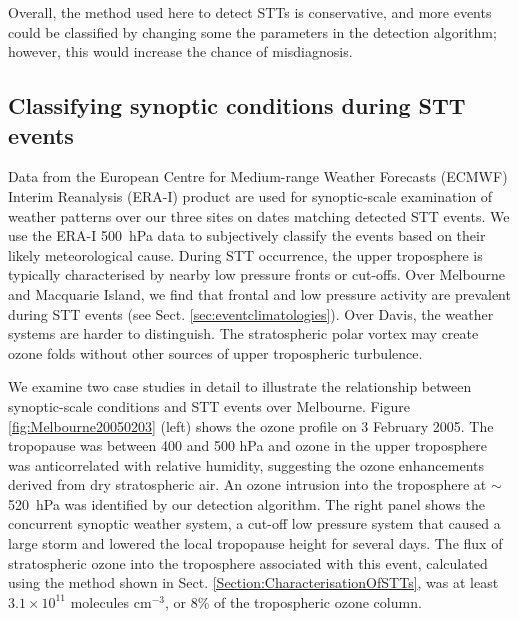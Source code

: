     Overall, the method used here to detect STTs is conservative, and more events could be classified by changing some the parameters in the detection algorithm; however, this would increase the chance of misdiagnosis. 

  \subsection{Classifying synoptic conditions during STT events}
  \label{Section:WeatherClassifications}
    Data from the European Centre for Medium-range Weather Forecasts (ECMWF) Interim Reanalysis (ERA-I) \citep{Dee2011} product are used for synoptic-scale examination of weather patterns over our three sites on dates matching detected STT events.
    We use the ERA-I 500~hPa data to subjectively classify the events based on their likely meteorological cause.
    During STT occurrence, the upper troposphere is typically characterised by nearby low pressure fronts or cut-offs.
    Over Melbourne and Macquarie Island, we find that frontal and low pressure activity are prevalent during STT events (see Sect. \ref{sec:eventclimatologies}).
    Over Davis, the weather systems are harder to distinguish. The stratospheric polar vortex may create ozone folds without other sources of upper tropospheric turbulence.

    We examine two case studies in detail to illustrate the relationship between synoptic-scale conditions and STT events  over Melbourne.
    Figure \ref{fig:Melbourne20050203} (left) shows the ozone profile on 3 February 2005.
    The tropopause was between 400 and 500 hPa and ozone in the upper troposphere was anticorrelated with relative humidity, suggesting the ozone enhancements derived from dry stratospheric air. 
    An ozone intrusion into the troposphere at $\sim$520~hPa was identified by our detection algorithm.
    The right panel shows the concurrent synoptic weather system, a cut-off low pressure system that caused a large storm and lowered the local tropopause height for several days.
    The flux of stratospheric ozone into the troposphere associated with this event, calculated using the method shown in Sect. \ref{Section:CharacterisationOfSTTs}, was at least $3.1 \times 10^{11}$ molecules cm$^{-3}$, or 8\% of the tropospheric ozone column.

